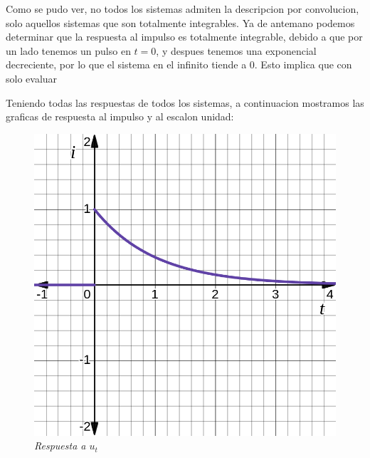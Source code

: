 \documentclass[12pt,a4paper]{report}
\begin{document}
\begin{enumerate}[label=\alph*)]
\begin{table}[h!]
\begin{tabular}{|c|c|c|c|}
        \end{tabular}
      \end{table}

      Como se pudo ver, no todos los sistemas admiten la descripcion por convolucion, solo aquellos sistemas que son
      totalmente integrables. Ya de antemano podemos determinar que la respuesta al impulso es totalmente integrable,
      debido a que por un lado tenemos un pulso en $t=0$, y despues tenemos una exponencial decreciente, por lo que
      el sistema en el infinito tiende a 0. Esto implica que con solo evaluar 

      Teniendo todas las respuestas de todos los sistemas, a continuacion mostramos las graficas de respuesta al
      impulso y al escalon unidad:

      \noindent
      \begin{figure}[h]
        \centering
        \begin{minipage}[h]{0.4\textwidth}
          \centering
          \includegraphics[width=1\textwidth]{./images/ej4.2.png}
          \textit{Respuesta a $u_t$}
        \end{minipage}
        \hspace{5mm}
        \begin{minipage}[h]{0.4\textwidth}
          \centering

\end{minipage}
\end{figure}
\end{enumerate}
\end{document}
